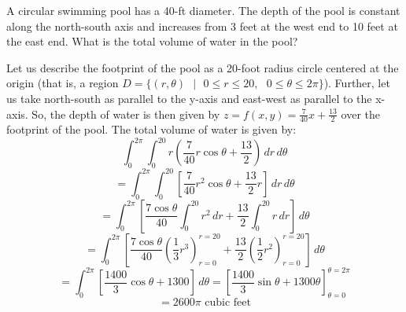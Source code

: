 \begin{Exercise}[title = {The volume of a pool}, label = polarmulti2]
A circular swimming pool has a 40-ft diameter. The depth of the pool is 
constant along the north-south axis and increases from 3 feet at the west end 
to 10 feet at the east end. What is the total volume of water in the pool? 
\vspace{50mm}
\end{Exercise}

\begin{Answer}[ref = polarmulti2]
Let us describe the footprint of the pool as a 20-foot radius circle centered 
at the origin (that is, a region $\textit{D} = \{(r, \theta)\text{ }|\text{ }0 
\leq r \leq 20,\text{ }0 \leq \theta \leq 2\pi\}$). Further, let us take 
north-south as parallel to the y-axis and east-west as parallel to the x-axis. 
So, the depth of water is then given by $z = f(x, y) = \frac{7}{40}x + \frac{
13}{2}$ over the footprint of the pool. The total volume of water is given 
by:
$$\int_0^{2\pi} \int_0^{20} r \left( \frac{7}{40}r\cos{\theta} + \frac{13}{2} 
\right)\,dr\,d\theta$$
$$= \int_0^{2\pi} \int_0^{20} \left[ \frac{7}{40}r^2\cos{\theta} + \frac{13}{2}
r \right] \,dr\,d\theta$$
$$= \int_0^{2\pi} \left[ \frac{7\cos{\theta}}{40}\int_0^{20} r^2\,dr + \frac{13
}{2} \int_0^{20} r\,dr \right]\,d\theta$$
$$= \int_0^{2\pi} \left[ \frac{7\cos{\theta}}{40} \left( \frac{1}{3}r^3 \right)
_{r = 0}^{r = 20} + \frac{13}{2} \left( \frac{1}{2}r^2 \right)_{r = 0}^{r = 20}
\right]\,d\theta$$
$$= \int_0^{2\pi} \left[ \frac{1400}{3}\cos{\theta} + 1300 \right]\,d\theta = 
\left[ \frac{1400}{3}\sin{\theta} + 1300\theta \right]_{\theta = 0}^{\theta = 
2\pi}$$
$$= 2600\pi \text{ cubic feet}$$    
\end{Answer}
